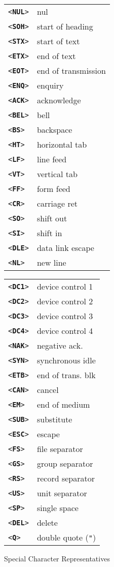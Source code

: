 \documentclass[12pt]{article}
\makeatletter
\newcommand{\tttkey}[1]{{\tt <{\bf #1}>}\index{#1@{\tt <#1>}}}
\newlength{\figurewidth}
\newenvironment{boxedfigure}[1][!btp]%
	{\begin{figure*}[#1]
	 \begin{lrbox}{\figurebox}
	 \begin{minipage}{\figurewidth}

	 \vspace*{1ex}}%
	{
	 \vspace*{1ex}

	 \end{minipage}
	 \end{lrbox}
	 \begin{center}
	 \fbox{\hspace*{0.1in}\usebox{\figurebox}\hspace*{0.1in}}
	 \end{center}
	 \end{figure*}}
\makeatother
\begin{document}
\begin{boxedfigure}[!t]

\begin{center}
\begin{tabular}{lp{2in}}
\tttkey{NUL} & nul \\
\tttkey{SOH} & start of heading \\
\tttkey{STX} & start of text \\
\tttkey{ETX} & end of text \\
\tttkey{EOT} & end of transmission \\
\tttkey{ENQ} & enquiry \\
\tttkey{ACK} & acknowledge \\
\tttkey{BEL} & bell \\
\tttkey{BS}  & backspace \\
\tttkey{HT}  & horizontal tab \\
\tttkey{LF}  & line feed \\
\tttkey{VT}  & vertical tab \\
\tttkey{FF}  & form feed \\
\tttkey{CR}  & carriage ret \\
\tttkey{SO}  & shift out \\
\tttkey{SI}  & shift in \\
\tttkey{DLE} & data link escape
\\[1ex]
\tttkey{NL}  & new line \\
\end{tabular}
\begin{tabular}{lp{2in}}
\tttkey{DC1} & device control 1 \\
\tttkey{DC2} & device control 2 \\
\tttkey{DC3} & device control 3 \\
\tttkey{DC4} & device control 4 \\
\tttkey{NAK} & negative ack. \\
\tttkey{SYN} & synchronous idle \\
\tttkey{ETB} & end of trans. blk \\
\tttkey{CAN} & cancel \\
\tttkey{EM}  & end of medium \\
\tttkey{SUB} & substitute \\
\tttkey{ESC} & escape \\
\tttkey{FS}  & file separator \\
\tttkey{GS}  & group separator \\
\tttkey{RS}  & record separator \\
\tttkey{US}  & unit separator \\
\tttkey{SP}  & single space \\
\tttkey{DEL} & delete
\\[1ex]
\tttkey{Q}  & double quote ({\tt "}) \\
\end{tabular}
\end{center}

\caption{Special Character Representatives}
\label{SPECIAL-CHARACTER-REPRESENTATIVES}
\end{boxedfigure}
\end{document}
